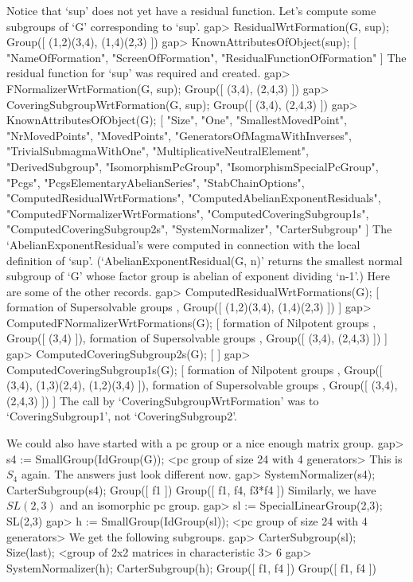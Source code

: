 Notice that `sup' does not yet have a residual function.
 Let's compute some subgroups of `G' corresponding to `sup'.
\beginexample
gap> ResidualWrtFormation(G, sup);
Group([ (1,2)(3,4), (1,4)(2,3) ])
gap> KnownAttributesOfObject(sup);
[ "NameOfFormation", "ScreenOfFormation", "ResidualFunctionOfFormation" ]
\endexample
 The residual function for `sup' was required and created.
\beginexample
gap> FNormalizerWrtFormation(G, sup);
Group([ (3,4), (2,4,3) ])
gap> CoveringSubgroupWrtFormation(G, sup);
Group([ (3,4), (2,4,3) ])
gap> KnownAttributesOfObject(G);
[ "Size", "One", "SmallestMovedPoint", "NrMovedPoints", "MovedPoints", 
  "GeneratorsOfMagmaWithInverses", "TrivialSubmagmaWithOne", 
  "MultiplicativeNeutralElement", "DerivedSubgroup", "IsomorphismPcGroup", 
  "IsomorphismSpecialPcGroup", "Pcgs", "PcgsElementaryAbelianSeries", 
  "StabChainOptions", "ComputedResidualWrtFormations", 
  "ComputedAbelianExponentResiduals", "ComputedFNormalizerWrtFormations", 
  "ComputedCoveringSubgroup1s", "ComputedCoveringSubgroup2s", 
  "SystemNormalizer", "CarterSubgroup" ]
\endexample
 The `AbelianExponentResidual's were computed in connection with the
local definition of `sup'. (`AbelianExponentResidual(G, n)' returns
the smallest normal subgroup of `G' whose factor group is abelian of
exponent dividing `n-1'.) Here are some of the other records.
\beginexample
gap> ComputedResidualWrtFormations(G);
[ formation of Supersolvable groups , Group([ (1,2)(3,4), (1,4)(2,3) ]) ]
gap> ComputedFNormalizerWrtFormations(G);
[ formation of Nilpotent groups , Group([ (3,4) ]), 
  formation of Supersolvable groups , Group([ (3,4), (2,4,3) ]) ]
gap> ComputedCoveringSubgroup2s(G);
[  ]
gap> ComputedCoveringSubgroup1s(G);
[ formation of Nilpotent groups , Group([ (3,4), (1,3)(2,4), (1,2)(3,4) ]), 
  formation of Supersolvable groups , Group([ (3,4), (2,4,3) ]) ]
\endexample
The call by `CoveringSubgroupWrtFormation' was to `CoveringSubgroup1', not
`CoveringSubgroup2'.

We could also have started with a pc group or a nice enough matrix group.
\beginexample
gap> s4 := SmallGroup(IdGroup(G));
<pc group of size 24 with 4 generators>
\endexample
This is $S_4$ again. The answers just look different now.
\beginexample
gap> SystemNormalizer(s4); CarterSubgroup(s4);
Group([ f1 ])
Group([ f1, f4, f3*f4 ])
\endexample
Similarly, we have $SL(2,3)$ and an isomorphic pc group.
\beginexample
gap> sl := SpecialLinearGroup(2,3);
SL(2,3)
gap> h := SmallGroup(IdGroup(sl));
<pc group of size 24 with 4 generators>
\endexample
We get the following subgroups.
\beginexample
gap> CarterSubgroup(sl); Size(last);
<group of 2x2 matrices in characteristic 3>
6
gap> SystemNormalizer(h); CarterSubgroup(h);
Group([ f1, f4 ])
Group([ f1, f4 ])
\endexample

